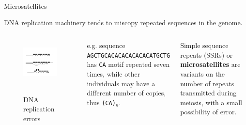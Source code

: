 \begin{frame}{Microsatellites}
	\bigskip

	DNA replication machinery tends to miscopy repeated sequences in the genome.

	\begin{columns}
	

                \begin{figure}
                        \includegraphics[width=1\textwidth]{Pics/microsat} \
                        \caption{DNA replication errors}
                \end{figure}


		\small{e.g. sequence \texttt{AGCTGCACACACACACACATGCTG} has \texttt{CA} motif 
	 	repeated seven times, while other individuals may have a different 
	 	number of copies, thus \texttt{(CA)$_n$}.}

		\bigskip

		Simple sequence repeats (SSRs) or \textbf{microsatellites} are variants on the number of
		repeats transmitted during meiosis, with a small possibility of error.

	\end{columns}

\end{frame}


